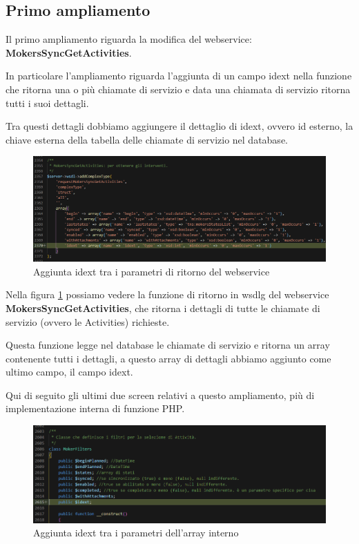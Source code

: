 \subsection{Primo ampliamento}
Il primo ampliamento riguarda la modifica del webservice:  \\ \textbf{MokersSyncGetActivities}.


\newspace
\begin{flushleft}
	In particolare l'ampliamento riguarda l'aggiunta di un campo idext nella funzione che ritorna una o più chiamate di servizio e data una chiamata di servizio ritorna tutti i suoi dettagli.
	
	Tra questi dettagli dobbiamo aggiungere il dettaglio di idext, ovvero id esterno, la chiave esterna della tabella delle chiamate di servizio nel database.
\end{flushleft}
\newspace
\begin{figure}[!h] 
	\centering
	\includegraphics[scale = 0.4]{immagini/webservices/ampliamenti/1ampl_types_changefunction} 
	\caption{Aggiunta idext tra i parametri di ritorno del webservice}
	\label{fig:5-1}
\end{figure}
\newspace
\begin{flushleft}
	Nella figura \ref{fig:5-1} possiamo vedere la funzione di ritorno in \gls{wsdlg} del webservice \textbf{MokersSyncGetActivities}, che ritorna i dettagli di tutte le chiamate di servizio (ovvero le Activities) richieste. 
	
	Questa funzione legge nel database le chiamate di servizio e ritorna un array contenente tutti i dettagli, a questo array di dettagli abbiamo aggiunto come ultimo campo, il campo idext.
\end{flushleft}

\newpage

\begin{flushleft}
	Qui di seguito gli ultimi due screen relativi a questo ampliamento, più di implementazione interna di funzione PHP.
\end{flushleft}
\begin{figure}[!h] 
	\centering
	\includegraphics[scale = 0.5]{immagini/webservices/ampliamenti/1ampl_utils_filters.png}
	\caption{Aggiunta idext tra i parametri dell'array interno}
	\label{fig:5-2}
\end{figure}

